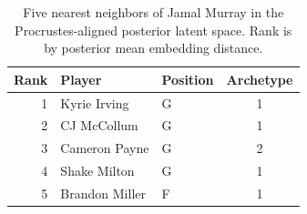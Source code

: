 \begin{table}[htbp]
  \centering\small
  \begin{tabular}{rllc}
    \toprule
    Rank & Player & Position & Archetype \\
    \midrule
    1 & Kyrie Irving & G & 1 \\
    2 & CJ McCollum & G & 1 \\
    3 & Cameron Payne & G & 2 \\
    4 & Shake Milton & G & 1 \\
    5 & Brandon Miller & F & 1 \\
    \bottomrule
  \end{tabular}
  \caption{Five nearest neighbors of Jamal Murray in the Procrustes-aligned posterior latent space. Rank is by posterior mean embedding distance.}
  \label{tab:Jamal_Murray_neighbors}
\end{table}

